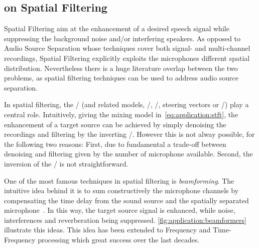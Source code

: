 
\subsection{on Spatial Filtering}
Spatial Filtering aim at the enhancement of a desired speech signal while suppressing the background noise and/or interfering speakers.
As opposed to Audio Source Separation whose techniques cover both signal- and multi-channel recordings, Spatial Filtering explicitly exploits the microphones different spatial distribution.
Nevertheless there is a huge literature overlap between the two problems, as spatial filtering techniques can be used to address audio source separation.

\mynewline
In spatial filtering, the \RIRs/ (and related models, \eg/, \RTFs/, steering vectors or \ReTFs/) play a central role.
Intuitively, giving the mixing model in~\cref{eq:application:stft}, the enhancement of a target source can be achieved by simply denoising the recordings and filtering by the inverting \RIRs/.
However this is not alway possible, for the following two reasons:
First, due to fundamental a trade-off between denoising and filtering given by the number of microphone available.
Second, the inversion of the \RIRs/ is not straightforward.

\mynewline
One of the most famous techniques in spatial filtering is \textit{beamforming}.
The intuitive idea behind it is to sum constructively the microphone channels by compensating the time delay from the sound source and the spatially separated microphone~.
In this way, the target source signal is enhanced, while noise, interferences and reverberation being suppressed.
\cref{fig:application:beamformers} illustrate this ideas.
This idea has been extended to Frequency and Time-Frequency processing which great success over the last decades.







